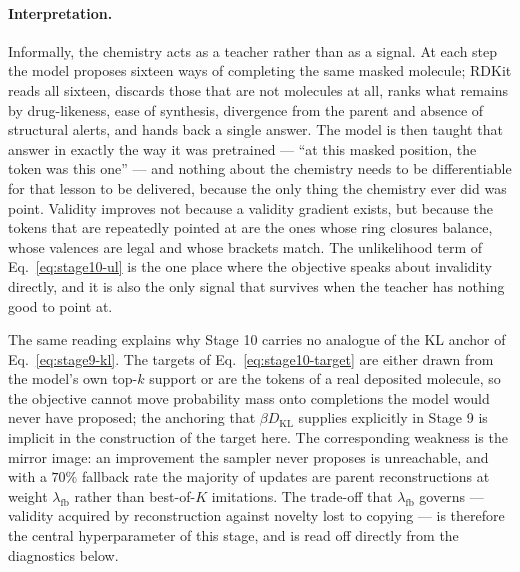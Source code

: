 \paragraph{Interpretation.}
Informally, the chemistry acts as a teacher rather than as a signal. At each
step the model proposes sixteen ways of completing the same masked molecule;
RDKit reads all sixteen, discards those that are not molecules at all, ranks
what remains by drug-likeness, ease of synthesis, divergence from the parent
and absence of structural alerts, and hands back a single answer. The model is
then taught that answer in exactly the way it was pretrained --- ``at this
masked position, the token was this one'' --- and nothing about the chemistry
needs to be differentiable for that lesson to be delivered, because the only
thing the chemistry ever did was point. Validity improves not because a
validity gradient exists, but because the tokens that are repeatedly pointed at
are the ones whose ring closures balance, whose valences are legal and whose
brackets match. The unlikelihood term of Eq.~\eqref{eq:stage10-ul} is the one
place where the objective speaks about invalidity directly, and it is also the
only signal that survives when the teacher has nothing good to point at.

The same reading explains why Stage 10 carries no analogue of the KL anchor of
Eq.~\eqref{eq:stage9-kl}. The targets of Eq.~\eqref{eq:stage10-target} are
either drawn from the model's own top-$k$ support or are the tokens of a real
deposited molecule, so the objective cannot move probability mass onto
completions the model would never have proposed; the anchoring that
$\beta D_{\mathrm{KL}}$ supplies explicitly in Stage 9 is implicit in the
construction of the target here. The corresponding weakness is the mirror
image: an improvement the sampler never proposes is unreachable, and with a
$70\%$ fallback rate the majority of updates are parent reconstructions at
weight $\lambda_{\mathrm{fb}}$ rather than best-of-$K$ imitations. The
trade-off that $\lambda_{\mathrm{fb}}$ governs --- validity acquired by
reconstruction against novelty lost to copying --- is therefore the central
hyperparameter of this stage, and is read off directly from the diagnostics
below.


